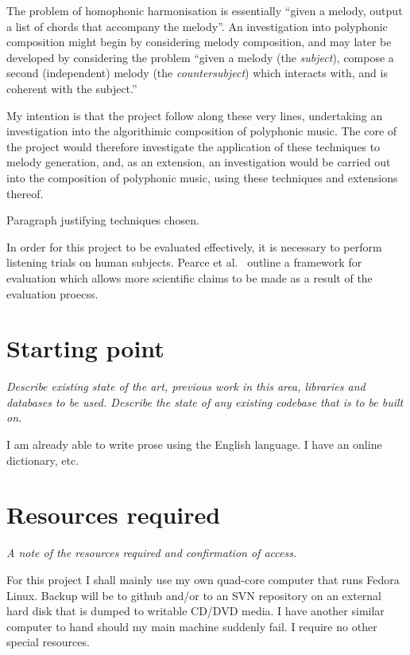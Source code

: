 \documentclass[12pt,a4paper,twoside]{article}
\begin{document}
The problem of homophonic harmonisation is essentially ``given a melody, output a list of chords that accompany the melody''. An investigation into polyphonic composition might begin by considering melody composition, and may later be developed by considering the problem ``given a melody (the \emph{subject}), compose a second (independent) melody (the \emph{countersubject}) which interacts with, and is coherent with the subject.''

My intention is that the project follow along these very lines, undertaking an investigation into the algorithimic composition of polyphonic music. The core of the project would therefore investigate the application of these techniques to melody generation, and, as an extension, an investigation would be carried out into the composition of polyphonic music, using these techniques and extensions thereof.

Paragraph justifying techniques chosen.

In order for this project to be evaluated effectively, it is necessary to perform listening trials on human subjects. Pearce et al.\ \cite{pearce2001evaluation} outline a framework for evaluation which allows more scientific claims to be made as a result of the evaluation proecss. 

\section*{Starting point}

\emph{Describe existing state of the art, previous work in this area,
  libraries and databases to be used. Describe the state of any
  existing codebase that is to be built on.}

I am already able to write prose using the English language. I have an
online dictionary, etc.

\section*{Resources required}

\emph{A note of the resources required and confirmation of access.}

For this project I shall mainly use my own quad-core computer that
runs Fedora Linux. Backup will be to github and/or to an SVN
repository on an external hard disk that is dumped to writable CD/DVD
media. I have another similar computer to hand should my main machine
suddenly fail. I require no other special resources.
\end{document}
